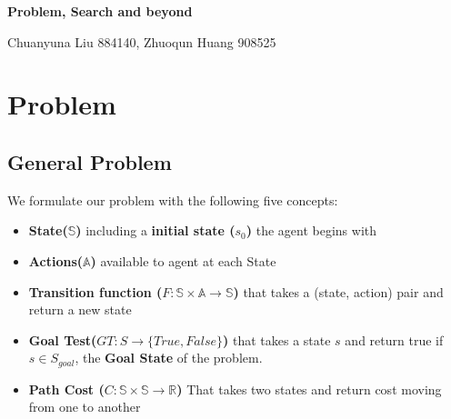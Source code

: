 \documentclass[11pt,a4paper]{article}
\begin{document}
    \begin{center}
        \large \textbf{Problem, Search and beyond}
        
        \normalsize Chuanyuna Liu 884140, Zhuoqun Huang 908525
    \end{center}
    \section{Problem}
    \subsection{General Problem}
    We formulate our problem with the following five concepts:
    \begin{itemize}
        \itemsep0em
        \item \textbf{State($\mathbb{S}$)} including a \textbf{initial state ($s_0$)} the agent begins with
        \item \textbf{Actions($\mathbb{A}$)} available to agent at each State
        \item \textbf{Transition function ($F:\mathbb{S}\times \mathbb{A}\rightarrow \mathbb{S}$)} that takes a (state, action) pair and return a new state
        \item \textbf{Goal Test($GT:S\rightarrow \{True, False\}$)} that takes a state $s$ and return true if $s\in S_{goal}$, the \textbf{Goal State} of the problem.
        \item \textbf{Path Cost ($C:\mathbb{S}\times \mathbb{S}\rightarrow \mathbb{R}$)} That takes two states and return cost moving from one to another
    \end{itemize}
    \vspace{-15pt}
\end{document}
